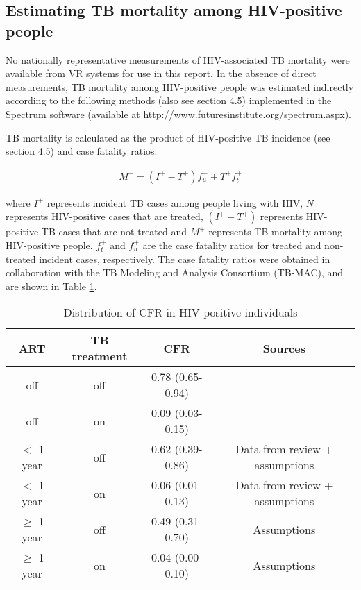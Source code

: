 \subsection{Estimating TB mortality among HIV-positive people}

No nationally representative measurements of HIV-associated TB mortality were available from VR systems for use in this report. In the absence of direct measurements, TB mortality among HIV-positive people was estimated indirectly according to the following methods (also see section 4.5) implemented in the Spectrum software (available at http://www.futuresinstitute.org/spectrum.aspx).

TB mortality is calculated as the product of HIV-positive TB incidence (see section 4.5) and case fatality ratios:

\begin{align*}
M^+ = (I^{\textrm{+}}-T^{\textrm{+}})f^{\textrm{+}}_u + T^{\textrm{+}}f^{\textrm{+}}_t
\end{align*}

where $I^{\textrm{+}}$ represents incident TB cases among people living with HIV, $N$ represents HIV-positive cases that are treated, $(I^{\textrm{+}}-T^{\textrm{+}})$ represents HIV-positive TB cases that are not treated and $M^{\textrm{+}}$ represents TB mortality among HIV-positive people. $f^{\textrm{+}}_t$ and $f^{\textrm{+}}_u$ are the case fatality ratios for treated and non-treated incident cases, respectively. The case fatality ratios were obtained in collaboration with the TB Modeling and Analysis Consortium (TB-MAC), and are shown in Table \ref{tab:hivcfr}.

\begin{table}
    \begin{tabular}{ c c c c }
    \hline
        ART  & TB treatment & CFR & Sources \\ 
        \hline
        off            & off  & 0.78 (0.65-0.94) &  \cite{12742798} \\ 
        off            & on   & 0.09 (0.03-0.15) & \cite{21738585} \cite{11216921}\\ 
        $<$ 1 year     & off  & 0.62 (0.39-0.86) & Data from review + assumptions \\ 
        $<$ 1 year     & on   & 0.06 (0.01-0.13) & Data from review + assumptions \\ 
        $\geq$ 1 year  & off  & 0.49 (0.31-0.70) & Assumptions \\ 
        $\geq$ 1 year  & on   & 0.04 (0.00-0.10) & Assumptions \\ 
        \hline
    \end{tabular} 
    \caption{Distribution of CFR in HIV-positive individuals}
    \label{tab:hivcfr}
\end{table}

